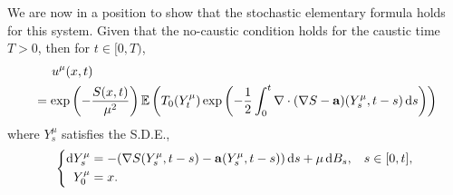 \documentclass[a4paper,12pt,draft]{report}
\theoremstyle{remark}
\theoremstyle{definition}
\begin{document}
We are now in a position to show that the stochastic elementary formula holds for this system.
\theorem
{
Given that the no-caustic condition holds for the caustic time $T > 0$, then for $t \in [0, T)$,
\begin{align}
& \hspace{0.5cm} u^\mu(x, t)\nonumber\\
& = \exp\left(-\frac{S(x, t)}{\mu^2}\right)\mathbb{E}\left(T_0(Y_t^\mu)\exp\left(-\frac{1}{2}\int_0^t\nabla\cdot(\nabla S - \bold{a})(Y_s^\mu, t - s)\,\mathrm{d}s\right)\right) \label{SEF2}
\end{align}
where $Y_s^\mu$ satisfies the S.D.E.,
$$
\left\{
\begin{aligned}
\mathrm{d}Y_s^\mu & = -(\nabla S(Y_s^\mu, t - s) - \bold{a}(Y_s^\mu, t - s))\,\mathrm{d}s + \mu\,\mathrm{d}B_s, \hspace{0.3cm} s \in [0, t],\\
Y_0^\mu & = x.
\end{aligned}
\right.
$$
}
\proof
\end{document}
